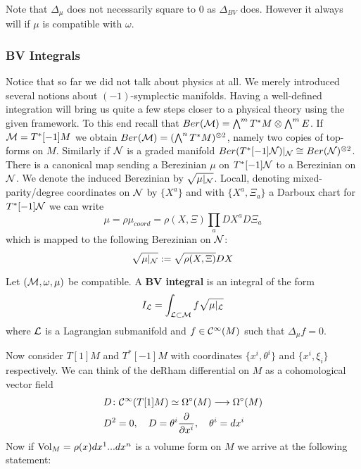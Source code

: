 \begin{rem}
  Note that $\Delta_\mu$ does not necessarily square to $0$ as $\Delta_{BV}$ does. However it always will if $\mu$ is compatible with $\omega$.
\end{rem}

\subsubsection{BV Integrals}
Notice that so far we did not talk about physics at all. We merely introduced several notions about $(-1)$-symplectic manifolds. Having a well-defined integration will bring us quite a few steps closer to a physical theory using the given framework. To this end recall that $Ber(\mathcal{M}) = \bigwedge^m T^* M \otimes \bigwedge^m E$. If $\mathcal{M} = T^*[-1] M$ we obtain $Ber(\mathcal{M}) = (\bigwedge^n T^*M)^{\otimes 2}$, namely two copies of top-forms on $M$. Similarly if $\mathcal{N}$ is a graded manifold $Ber(T^*[-1]\mathcal{N})|_{\mathcal{N}} \cong Ber(\mathcal{N})^{\otimes 2}$.\\


There is a canonical map sending a Berezinian $\mu$ on $T^*[-1]\mathcal{N}$ to a Berezinian on $\mathcal{N}$. We denote the induced Berezinian by $\sqrt{\mu|_{\mathcal{N}}}$. Locall, denoting mixed-parity/degree coordinates on $\mathcal{N}$ by $\{X^a\}$ and with $\{X^a, \Xi_a \}$ a Darboux chart for $T^*[-1]\mathcal{N}$ we can write
\begin{equation}
  \mu = \rho \mu_{coord} = \rho(X, \Xi) \prod_a DX^a D\Xi_a
\end{equation}
which is mapped to the following Berezinian on $\mathcal{N}$:
\begin{equation}
  \sqrt{\mu|_{\mathcal{N}}} := \sqrt{\rho(X, \Xi)} DX
\end{equation}

\begin{definition}[BV Integral]
  Let $(\mathcal{M}, \omega, \mu)$ be compatible. A \textbf{BV integral} is an integral of the form
  \begin{equation}
    I_{\mathcal{L}} = \int_{\mathcal{L} \subset \mathcal{M}} f \sqrt{\mu|_{\mathcal{L}}}
  \end{equation}
  where $\mathcal{L}$ is a Lagrangian submanifold and $f \in \mathcal{C}^{\infty}(M)$ such that $\Delta_\mu f = 0$.
\end{definition}

Now consider $T[1]M$ and $T^*[-1]M$ with coordinates $\{x^i, \theta^i \}$ and $\{x^i, \xi_i \}$ respectively. We can think of the deRham differential on $M$ as a cohomological vector field
\begin{align}
  &D \colon \mathcal{C}^{\infty}(T[1]M) \simeq \Omega^\circ(M) \longrightarrow \Omega^\circ(M) \\
  &D^2 = 0, \quad D = \theta^i \frac{\partial }{\partial x^i}, \quad \theta^i = dx^i
\end{align}
Now if $\operatorname{Vol}_M = \rho(x) dx^1 ... dx^n$ is a volume form on $M$ we arrive at the following statement:

